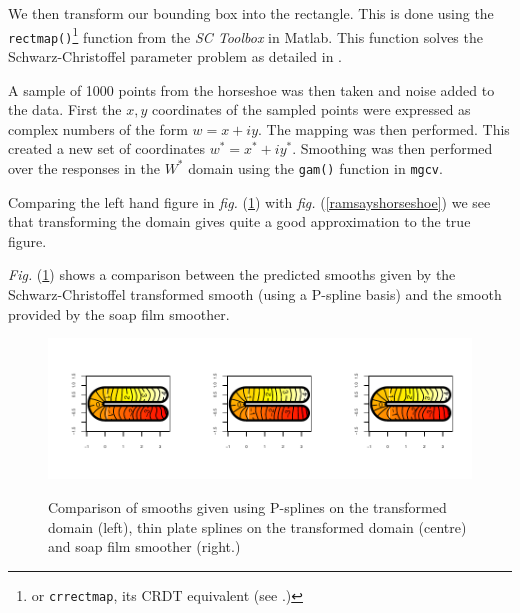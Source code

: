 \documentclass[a4paper,10pt]{amsart}
\newcommand{\sch}{Schwarz-Christoffel }
\newcommand{\fig}[1]{\emph{fig.} (\ref{#1})}
\newcommand{\Fig}[1]{\emph{Fig.} (\ref{#1})}
\begin{document}
We then transform our bounding box into the rectangle. This is done using the \texttt{rectmap()}\footnote{or \texttt{crrectmap}, its CRDT equivalent (see \cite{miller08}.)} function from the \emph{SC Toolbox} in Matlab. This function solves the \sch parameter problem as detailed in \cite{miller08}.

A sample of 1000 points from the horseshoe was then taken and noise added to the data. First the $x,y$ coordinates of the sampled points were expressed as complex numbers of the form $w=x+iy$. The mapping was then performed. This created a new set of coordinates $w^*=x^*+iy^*$. Smoothing was then performed over the responses in the $W^*$ domain using the \texttt{gam()} function in \texttt{mgcv}. 

Comparing the left hand figure in \fig{compsmooth} with \fig{ramsayshorseshoe} we see that transforming the domain gives quite a good approximation to the true figure.

\Fig{compsmooth} shows a comparison between the predicted smooths given by the \sch transformed smooth (using a P-spline basis) and the smooth provided by the soap film smoother. 


\begin{figure}
\centering
\includegraphics[trim=0.5in 0.5in 0in 0in]{figs/compsmooth.pdf} \\
\caption{Comparison of smooths given using P-splines on the transformed domain (left), thin plate splines on the transformed domain (centre) and soap film smoother (right.)}
\label{compsmooth}
\end{figure}

\end{document}
